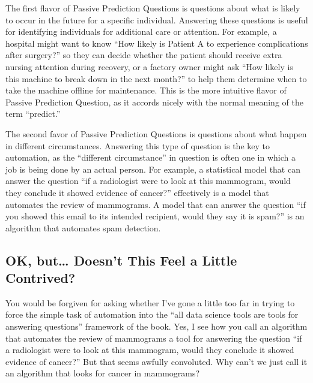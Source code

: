 \documentclass[letterpaper,10pt,english]{jupyterBook}
\begin{document}
\sphinxAtStartPar
The first flavor of Passive Prediction Questions is questions about what is likely to occur in the future for a specific individual. Answering these questions is useful for identifying individuals for additional care or attention. For example, a hospital might want to know “How likely is Patient A to experience complications after surgery?” so they can decide whether the patient should receive extra nursing attention during recovery, or a factory owner might ask “How likely is this machine to break down in the next month?” to help them determine when to take the machine offline for maintenance. This is the more intuitive flavor of Passive Prediction Question, as it accords nicely with the normal meaning of the term “predict.”

\sphinxAtStartPar
The second favor of Passive Prediction Questions is questions about what  happen in different circumstances. Answering this type of question is the key to automation, as the “different circumstance” in question is often one in which a job is being done by an actual person. For example, a statistical model that can answer the question “if a radiologist were to look at this mammogram, would they conclude it showed evidence of cancer?” effectively is a model that automates the review of mammograms. A model that can answer the question “if you showed this email to its intended recipient, would they say it is spam?” is an algorithm that automates spam detection.


\subsection{OK, but… Doesn’t This Feel a Little Contrived?}
\label{\detokenize{30_questions/20_using_passive_prediction_questions:ok-but-doesn-t-this-feel-a-little-contrived}}
\sphinxAtStartPar
You would be forgiven for asking whether I’ve gone a little too far in trying to force the simple task of automation into the “all data science tools are tools for answering questions” framework of the book. Yes, I see how you  call an algorithm that automates the review of mammograms a tool for answering the question “if a radiologist were to look at this mammogram, would they conclude it showed evidence of cancer?” But that seems awfully convoluted. Why can’t we just call it an algorithm that looks for cancer in mammograms?
\end{document}
